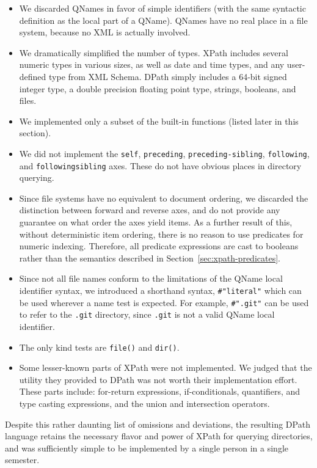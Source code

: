 \documentclass{article}
\begin{document}
\begin{itemize}
\item We discarded QNames in favor of simple identifiers (with the same
  syntactic definition as the local part of a QName). QNames have no real place
  in a file system, because no XML is actually involved.
\item We dramatically simplified the number of types. XPath includes several
  numeric types in various sizes, as well as date and time types, and any
  user-defined type from XML Schema. DPath simply includes a 64-bit signed
  integer type, a double precision floating point type, strings, booleans, and
  files.
\item We implemented only a subset of the built-in functions (listed later in
  this section).
\item We did not implement the \texttt{self}, \texttt{preceding},
  \texttt{preceding-sibling}, \texttt{following}, and
  \texttt{following\-sibling} axes. These do not have obvious places in
  directory querying.
\item Since file systems have no equivalent to document ordering, we discarded
  the distinction between forward and reverse axes, and do not provide any
  guarantee on what order the axes yield items. As a further result of this,
  without deterministic item ordering, there is no reason to use predicates for
  numeric indexing. Therefore, all predicate expressions are cast to booleans
  rather than the semantics described in Section~\ref{sec:xpath-predicates}.
\item Since not all file names conform to the limitations of the QName local
  identifier syntax, we introduced a shorthand syntax, \texttt{\#"literal"}
  which can be used wherever a name test is expected. For example,
  \texttt{\#".git"} can be used to refer to the \texttt{.git} directory, since
  \texttt{.git} is not a valid QName local identifier.
\item The only kind tests are \texttt{file()} and \texttt{dir()}.
\item Some lesser-known parts of XPath were not implemented. We judged that the
  utility they provided to DPath was not worth their implementation effort.
  These parts include: for-return expressions, if-conditionals, quantifiers, and
  type casting expressions, and the union and intersection operators.
\end{itemize}

Despite this rather daunting list of omissions and deviations, the resulting
DPath language retains the necessary flavor and power of XPath for querying
directories, and was sufficiently simple to be implemented by a single person in
a single semester.
\end{document}

